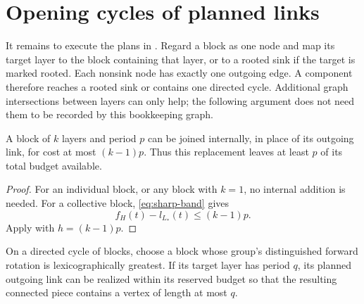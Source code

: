 \section{Opening cycles of planned links}\label{sec:cycles}

It remains to execute the plans in . Regard a block as one node and map its target layer to the block containing that layer, or to a rooted sink if the target is marked rooted. Each nonsink node has exactly one outgoing edge. A component therefore reaches a rooted sink or contains one directed cycle. Additional graph intersections between layers can only help; the following argument does not need them to be recorded by this bookkeeping graph.

\begin{lemma}\label{lem:free-period}
A block of $k$ layers and period $p$ can be joined internally, in place of its outgoing link, for cost at most $(k-1)p$. Thus this replacement leaves at least $p$ of its total budget available.
\end{lemma}

\begin{proof}
For an individual block, or any block with $k=1$, no internal addition is needed. For a collective block, \eqref{eq:sharp-band} gives
\[
f_H(t)-l_{L_*}(t)\le(k-1)p.
\]
Apply  with $h=(k-1)p$.
\end{proof}

\begin{lemma}\label{lem:cycle-contact}
On a directed cycle of blocks, choose a block whose group's distinguished forward rotation is lexicographically greatest. If its target layer has period $q$, its planned outgoing link can be realized within its reserved budget so that the resulting connected piece contains a vertex of length at most $q$.
\end{lemma}

